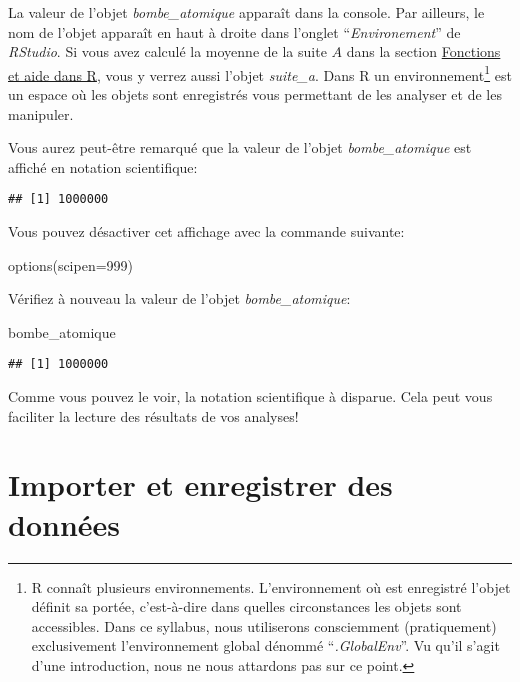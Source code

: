 \documentclass[
]{book}
\newenvironment{Shaded}{\begin{snugshade}}{\end{snugshade}}
\newcommand{\AttributeTok}[1]{\textcolor[rgb]{0.77,0.63,0.00}{#1}}
\newcommand{\DecValTok}[1]{\textcolor[rgb]{0.00,0.00,0.81}{#1}}
\newcommand{\FunctionTok}[1]{\textcolor[rgb]{0.00,0.00,0.00}{#1}}
\newcommand{\NormalTok}[1]{#1}
\begin{document}
La valeur de l'objet \emph{bombe\_atomique} apparaît dans la console. Par ailleurs, le nom de l'objet apparaît en haut à droite dans l'onglet ``\emph{Environement}'' de \emph{RStudio}. Si vous avez calculé la moyenne de la suite \(A\) dans la section \protect\hyperlink{Fonctions_aides}{Fonctions et aide dans R}, vous y verrez aussi l'objet \emph{suite\_a}. Dans R un environnement\footnote{R connaît plusieurs environnements. L'environnement où est enregistré l'objet définit sa portée, c'est-à-dire dans quelles circonstances les objets sont accessibles. Dans ce syllabus, nous utiliserons consciemment (pratiquement) exclusivement l'environnement global dénommé ``\emph{.GlobalEnv}''. Vu qu'il s'agit d'une introduction, nous ne nous attardons pas sur ce point.} est un espace où les objets sont enregistrés vous permettant de les analyser et de les manipuler.

Vous aurez peut-être remarqué que la valeur de l'objet \emph{bombe\_atomique} est affiché en notation scientifique:

\begin{verbatim}
## [1] 1000000
\end{verbatim}

Vous pouvez désactiver cet affichage avec la commande suivante:

\begin{Shaded}
\begin{Highlighting}[]
\FunctionTok{options}\NormalTok{(}\AttributeTok{scipen=}\DecValTok{999}\NormalTok{)}
\end{Highlighting}
\end{Shaded}

Vérifiez à nouveau la valeur de l'objet \emph{bombe\_atomique}:

\begin{Shaded}
\begin{Highlighting}[]
\NormalTok{bombe\_atomique}
\end{Highlighting}
\end{Shaded}

\begin{verbatim}
## [1] 1000000
\end{verbatim}

Comme vous pouvez le voir, la notation scientifique à disparue. Cela peut vous faciliter la lecture des résultats de vos analyses!

\hypertarget{import_donnees}{%
\section{Importer et enregistrer des données}\label{import_donnees}}
\end{document}

